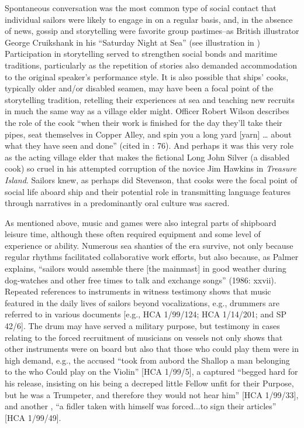 Spontaneous conversation was the most common type of social contact that individual sailors were likely to engage in on a regular basis, and, in the absence of news, gossip and storytelling were favorite group pastimes--as British illustrator George Cruikshank in his “Saturday Night at Sea” (see illustration in ) Participation in storytelling served to strengthen social bonds and maritime traditions, particularly as the repetition of stories also demanded accommodation to the original speaker’s performance style. It is also possible that ships’ cooks, typically older and/or disabled seamen, may have been a focal point of the storytelling tradition, retelling their experiences at sea and teaching new recruits in much the same way as a village elder might. Officer Robert Wilson describes the role of the cook “when their work is finished for the day they’ll take their pipes, seat themselves in Copper Alley, and spin you a long yard [yarn] … about what they have seen and done” (cited in \citealt{AdkinsAdkins2008}: 76). And perhaps it was this very role as the acting village elder that makes the fictional Long John Silver (a disabled cook) so cruel in his attempted corruption of the novice Jim Hawkins in  \textit{Treasure Island}. Sailors knew, as perhaps did Stevenson, that cooks were the focal point of social life aboard ship and their potential role in transmitting language features through narratives in a predominantly oral culture was sacred. 

As mentioned above, music and games were also integral parts of shipboard leisure time, although these often required equipment and some level of experience or ability. Numerous sea shanties of the era survive, not only because regular rhythms facilitated collaborative work efforts, but also because, as Palmer explains, “sailors would assemble there [the mainmast] in good weather during dog-watches and other free times to talk and exchange songs” (1986: xxvii). Repeated references to instruments in witness testimony shows that music featured in the daily lives of sailors beyond vocalizations, e.g., drummers are referred to in various documents [e.g., HCA 1/99/124; HCA 1/14/201; and SP 42/6]. The drum may have served a military purpose, but testimony in cases relating to the forced recruitment of musicians on  vessels not only  shows that other instruments were on board but also that those who could play them were in high demand, e.g., the accused “took from aubord the Shallop a man belonging to the  who Could play on the Violin” [HCA 1/99/5], a captured  “begged hard for his release, insisting on his being a decreped little Fellow unfit for their Purpose, but he was a Trumpeter, and therefore they would not hear him” [HCA 1/99/33], and another , “a fidler taken with himself was forced...to sign their articles” [HCA 1/99/49]. 

